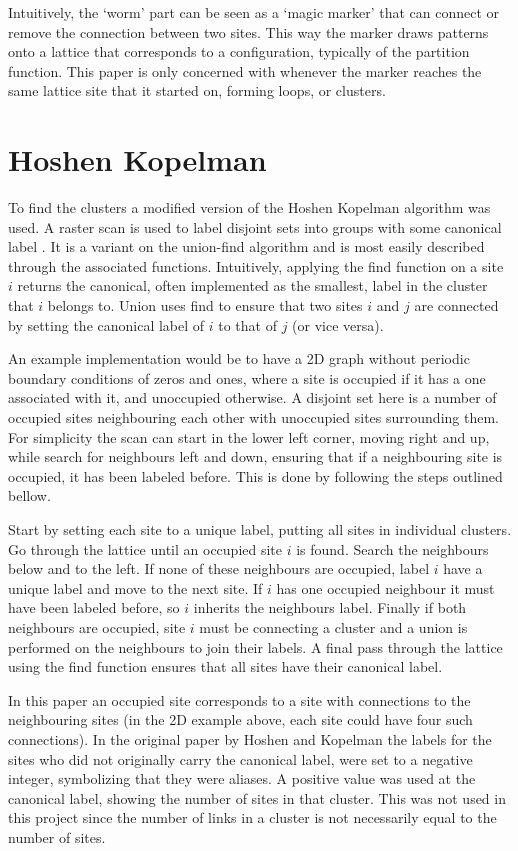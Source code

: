 Intuitively, the `worm' part can be seen as a `magic marker' that can connect or remove the connection between two sites. This way the marker draws patterns onto a lattice that corresponds to a configuration, typically of the partition function. This paper is only concerned with whenever the marker reaches the same lattice site that it started on, forming loops, or clusters.

\section{Hoshen Kopelman}
\label{sec:HoshenKopelman}

To find the clusters a modified version of the Hoshen Kopelman algorithm was used. A raster scan is used to label disjoint sets into groups with some canonical label \cite{Hoshen:HKAlgo}. It is a variant on the union-find algorithm and is most easily described through the associated functions. Intuitively, applying the find function on a site $i$ returns the canonical, often implemented as the smallest, label in the cluster that $i$ belongs to. Union uses find to ensure that two sites $i$ and $j$ are connected by setting the canonical label of $i$ to that of $j$ (or vice versa). 

An example implementation would be to have a 2D graph without periodic boundary conditions of zeros and ones, where a site is occupied if it has a one associated with it, and unoccupied otherwise. A disjoint set here is a number of occupied sites neighbouring each other with unoccupied sites surrounding them. For simplicity the scan can start in the lower left corner, moving right and up, while search for neighbours left and down, ensuring that if a neighbouring site is occupied, it has been labeled before. This is done by following the steps outlined bellow.

Start by setting each site to a unique label, putting all sites in individual clusters. Go through the lattice until an occupied site $i$ is found. Search the neighbours below and to the left. If none of these neighbours are occupied, label $i$ have a unique label and move to the next site. If $i$ has one occupied neighbour it must have been labeled before, so $i$ inherits the neighbours label. Finally if both neighbours are occupied, site $i$ must be connecting a cluster and a union is performed on the neighbours to join their labels. A final pass through the lattice using the find function ensures that all sites have their canonical label.

In this paper an occupied site corresponds to a site with connections to the neighbouring sites (in the 2D example above, each site could have four such connections). In the original paper by Hoshen and Kopelman \cite{Hoshen:HKAlgo} the labels for the sites who did not originally carry the canonical label, were set to a negative integer, symbolizing that they were aliases. A positive value was used at the canonical label, showing the number of sites in that cluster. This was not used in this project since the number of links in a cluster is not necessarily equal to the number of sites.

